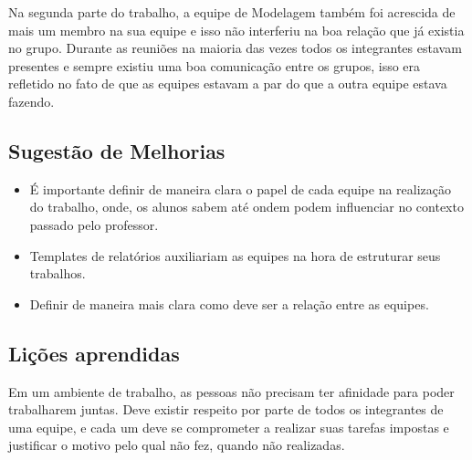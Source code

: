 Na segunda parte do trabalho,  a equipe de Modelagem também foi acrescida de mais um membro na sua equipe e isso não interferiu na boa relação que já existia no grupo. Durante as reuniões na maioria das vezes todos os integrantes estavam presentes e sempre existiu uma boa comunicação entre os grupos, isso era refletido no fato de que as equipes estavam a par do que a outra equipe estava fazendo.

\subsection{Sugestão de Melhorias}
\begin{itemize}
\item É importante definir de maneira clara o papel de cada equipe na realização do trabalho, onde, os alunos sabem até ondem podem influenciar no contexto passado pelo professor.
\item Templates de relatórios auxiliariam as equipes na hora de estruturar seus trabalhos.
\item Definir de maneira mais clara como deve ser a relação entre as equipes.
\end{itemize} 

\subsection{Lições aprendidas}
Em um ambiente de trabalho, as pessoas não precisam ter afinidade para poder trabalharem juntas. Deve existir respeito por parte de todos os integrantes de uma equipe, e cada um deve se comprometer a realizar suas tarefas impostas e justificar o motivo pelo qual não fez, quando não realizadas. 

